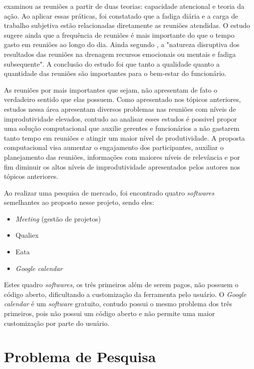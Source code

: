  examinou as reuniões a partir de duas teorias: capacidade atencional e teoria da ação. Ao aplicar essas práticas, foi constatado que a fadiga diária e a carga de trabalho subjetiva estão relacionadas diretamente as reuniões atendidas. O estudo sugere ainda que a frequência de reuniões é mais importante do que o tempo gasto em reuniões ao longo do dia. Ainda segundo , a "natureza disruptiva dos resultados das reuniões na drenagem recursos emocionais ou mentais e fadiga subsequente". A conclusão do estudo foi que tanto a qualidade quanto a quantidade das reuniões são importantes para o bem-estar do funcionário. 

As reuniões por mais importantes que sejam, não apresentam de fato o verdadeiro sentido que elas possuem. Como apresentado nos tópicos anteriores, estudos nessa área apresentam diversos problemas nas reuniões  com níveis de improdutividade elevados, contudo ao analisar esses estudos é possivel propor uma solução computacional que auxilie gerentes e funcionários a não gastarem tanto tempo em reuniões e atingir um maior nível de produtividade. A proposta computacional visa aumentar o engajamento dos participantes, auxiliar o planejamento das reuniões, informações com maiores níveis de relevância e por fim diminuir os altos níveis de improdutividade apresentados pelos autores nos tópicos anteriores.

Ao realizar uma pesquisa de mercado, foi encontrado quatro \textit{softwares} semelhantes ao proposto nesse projeto, sendo eles: 

\begin{itemize}
    \item \textit{Meeting} (gestão de projetos)
    \item Qualiex
    \item Eata
    \item \textit{Google calendar}
\end{itemize}

Estes quadro \textit{softwares}, os três primeiros além de serem pagos, não possuem o código aberto, dificultando a customização da ferramenta pelo usuário. O \textit{Google calendar} é um \textit{software} gratuito, contudo possui o mesmo problema dos três primeiros, pois não possui um código aberto e não permite uma maior customização por parte do usuário. 

\section{Problema de Pesquisa}
\label{sec:problema_de_pesquisa}

